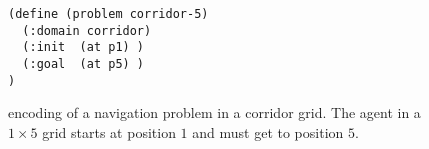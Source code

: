 \begin{comment}
 
\begin{itemize} %
\item version 1.2 (IPC--1998): STRIPS + ADL (conditional effects, general preconditions) 
\item version 2.1 (IPC--2002): temporal planning, numeric state variables, durative actions
\item ver. 2.2 (IPC--2004): derived predicates, times literals %
\item ver. 3.0 (IPC--2006): trajectory constraints (temporal logic), preferences (soft constraints)
\item ver. 3.1 (IPC--2008): functional state variables %
\item ver. ?? (IPC--2011): \ldots
\end{itemize}


Applications: cf. \citep{albore:robot, petrick:baseline}

\end{comment}
\begin{figure}[p] \begin{small}
\begin{verbatim}(define (problem corridor-5)
  (:domain corridor)
  (:init  (at p1) )
  (:goal  (at p5) )
)\end{verbatim} \vspace*{-50mm}
  \caption[\pddl{} encoding of a navigation problem in a corridor]{\pddl{} encoding of a navigation problem in a corridor
    grid. The agent in a $1\times 5$ grid starts at position $1$ and must
    get to position $5$.\label{fig:pddl-example-room-classical-p}}     
   \end{small}
\end{figure}

